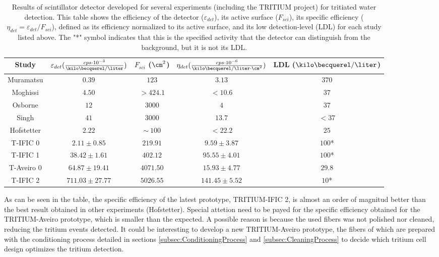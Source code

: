 \begin{table}[htbp]
\begin{center}
\begin{tabular}{|c|c|c|c|c|}
\hline
Study & \parbox{5.5em}{\centering $\varepsilon_{det}(\frac{cps \cdot{} 10^{-3}}{\kilo\becquerel/\liter})$}  & \parbox{4.5em}{\centering $F_{sci}$ ($\cm^2$)}  & \parbox{6.5em}{\centering $\eta_{det}(\frac{cps \cdot{} 10^{-6}}{\kilo\becquerel/ \liter \cdot{} \cm^2})$} & LDL ($\kilo\becquerel / \liter$)\\
\hline \hline \hline
Muramatsu & $0.39$ & $123$ & $3.13$ & $370$ \\ \hline
Moghissi & $4.50$ & $>424.1$ & $<10.6$ & $37$ \\\hline
Osborne & $12$ & $3000$ & $4$ & $37$ \\ \hline
Singh & $41$ & $3000$ & $13.7$ & $<37$ \\ \hline
Hofstetter & $2.22$ & $\sim~100$ & $<22.2$ & $25$ \\ \hline
T-IFIC 0 & $2.11 \pm 0.85$ & $219.91$ & $9.59 \pm 3.87$ & $100$* \\ \hline
T-IFIC 1 & $38.42 \pm 1.61$ & $402.12$ & $95.55 \pm 4.01$ & $100$* \\ \hline
T-Aveiro 0 & $64.87 \pm 19.41$ & $4071.50$ & $15.93 \pm 4.77$ & $29.8$ \\ \hline
T-IFIC 2 & $711.03 \pm 27.77$ & $5026.55$ & $141.45 \pm 5.52$ & $10$* \\ \hline
\end{tabular}
\caption{Results of scintillator detector developed for several experiments (including the TRITIUM project) for tritiated water detection. This table shows the efficiency of the detector ($\varepsilon_{det}$), its active surface ($F_{sci}$), its specific efficiency ($\eta_{det}=\varepsilon_{det}/F_{sci}$), defined as its efficiency normalized to its active surface, and its low detection-level (LDL) for each study listed above. The "*" symbol indicates that this is the specified activity that the detector can distinguish from the background, but it is not its LDL.}
\label{tab:ComparisonResultsTri}
\end{center}
\end{table}

As can be seen in the table, the specific efficiency of the latest prototype, TRITIUM-IFIC 2, is almost an order of magnitud better than the best result obtained in other experiments (Hofstetter). Special attetion need to be payed for the specific efficiency obtained for the TRITIUM-Aveiro prototype, which is smaller than the expected. A possible reason is because the used fibers was not polished nor cleaned, reducing the tritium events detected. It could be interesting to develop a new TRITIUM-Aveiro prototype, the fibers of which are prepared with the conditioning process detailed in sections \ref{subsec:ConditioningProcess} and \ref{subsec:CleaningProcess} to decide which tritium cell design optimizes the tritium detection. 

